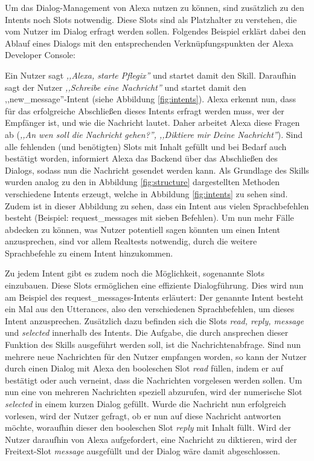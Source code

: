 Um das Dialog-Management von Alexa nutzen zu können, sind zusätzlich zu den Intents noch Slots notwendig. Diese Slots sind als Platzhalter zu verstehen, die vom Nutzer im Dialog erfragt werden sollen. Folgendes Beispiel erklärt dabei den Ablauf eines Dialogs mit den entsprechenden Verknüpfungspunkten der Alexa Developer Console:

Ein Nutzer sagt \textit{,,Alexa, starte Pflegix''} und startet damit den Skill. Daraufhin sagt der Nutzer \textit{,,Schreibe eine Nachricht''} und startet damit den ,,new\_message''-Intent (siehe Abbildung \ref{fig:intents}).
Alexa erkennt nun, dass für das erfolgreiche Abschließen dieses Intents erfragt werden muss, wer der Empfänger ist, und wie die Nachricht lautet.
Daher arbeitet Alexa diese Fragen ab (\textit{,,An wen soll die Nachricht gehen?'', ,,Diktiere mir Deine Nachricht''}). Sind alle fehlenden (und benötigten) Slots mit Inhalt gefüllt und bei Bedarf auch bestätigt worden, informiert Alexa das Backend über das Abschließen des Dialogs, sodass nun die Nachricht gesendet werden kann.
Als Grundlage des Skills wurden analog zu den in Abbildung \ref{fig:structure} dargestellten Methoden verschiedene Intents erzeugt, welche in Abbildung \ref{fig:intents} zu sehen sind. Zudem ist in dieser Abbildung zu sehen, dass ein Intent aus vielen Sprachbefehlen besteht (Beispiel: request\_messages mit sieben Befehlen). Um nun mehr Fälle abdecken zu können, was Nutzer potentiell sagen könnten um einen Intent anzusprechen, sind vor allem Realtests notwendig, durch die weitere Sprachbefehle zu einem Intent hinzukommen.

Zu jedem Intent gibt es zudem noch die Möglichkeit, sogenannte Slots einzubauen. Diese Slots ermöglichen eine effiziente Dialogführung. Dies wird nun am Beispiel des request\_messages-Intents erläutert:
Der genannte Intent besteht ein Mal aus den Utterances, also den verschiedenen Sprachbefehlen, um dieses Intent anzusprechen. Zusätzlich dazu befinden sich die Slots \textit{read, reply, message} und \textit{selected} innerhalb des Intents. Die Aufgabe, die durch ansprechen dieser Funktion des Skills ausgeführt werden soll, ist die Nachrichtenabfrage. Sind nun mehrere neue Nachrichten für den Nutzer empfangen worden, so kann der Nutzer durch einen Dialog mit Alexa den booleschen Slot \textit{read} füllen, indem er auf bestätigt oder auch verneint, dass die Nachrichten vorgelesen werden sollen. Um nun eine von mehreren Nachrichten speziell abzurufen, wird der numerische Slot \textit{selected} in einem kurzen Dialog gefüllt. Wurde die Nachricht nun erfolgreich vorlesen, wird der Nutzer gefragt, ob er nun auf diese Nachricht antworten möchte, woraufhin dieser den booleschen Slot \textit{reply} mit Inhalt füllt. Wird der Nutzer daraufhin von Alexa aufgefordert, eine Nachricht zu diktieren, wird der Freitext-Slot \textit{message} ausgefüllt und der Dialog wäre damit abgeschlossen.

